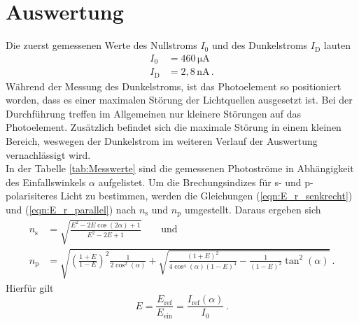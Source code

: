 


\nocite{anleitungV407}
\section{Auswertung}
\label{sec:Auswertung}
Die zuerst gemessenen Werte des Nullstroms $I_0$ und des Dunkelstroms $I_{\text{D}}$ lauten
\begin{align*}
  I_0 &= 460\,\unit{\micro\ampere}\\
  I_{\text{D}} &= 2,8\,\unit{\nano\ampere}\,.
\end{align*}
Während der Messung des Dunkelstroms, ist das Photoelement so positioniert worden, dass es einer maximalen 
Störung der Lichtquellen ausgesetzt ist. Bei der Durchführung treffen im Allgemeinen nur kleinere Störungen auf
das Photoelement. Zusätzlich befindet sich die maximale Störung in einem kleinen Bereich, weswegen der Dunkelstrom im weiteren Verlauf der Auswertung vernachlässigt wird.
\\In der Tabelle \ref{tab:Messwerte} sind die gemessenen Photoströme in Abhängigkeit des Einfallswinkels $\alpha$ aufgelistet.
Um die Brechungsindizes für s- und p-polarisiteres Licht zu bestimmen, werden die Gleichungen (\ref{eqn:E_r_senkrecht}) und (\ref{eqn:E_r_parallel}) nach $n_{\text{s}}$ und $n_{\text{p}}$
umgestellt. Daraus ergeben sich
\begin{align}
  n_{\text{s}} &= \sqrt{\frac{E^2 - 2E\cos(2\alpha) + 1}{E^2- 2E + 1}} \label{eqn:n_s} \qquad {\text{und}}\\
  n_{\text{p}} &= \sqrt{\left(\frac{1+E}{1-E}\right)^2 \frac{1}{2\cos^2(\alpha)} + \sqrt{\frac{(1+E)^2}{4\cos^4(\alpha)(1-E)^4}- \frac{1}{(1-E)^2} \tan^2(\alpha)}} \label{eqn:n_p}\,.
\end{align}
Hierfür gilt $$E = \frac{E_{\text{ref}}}{E_{\text{ein}}} = \frac{I_{\text{ref}}(\alpha)}{I_0}\,.$$
